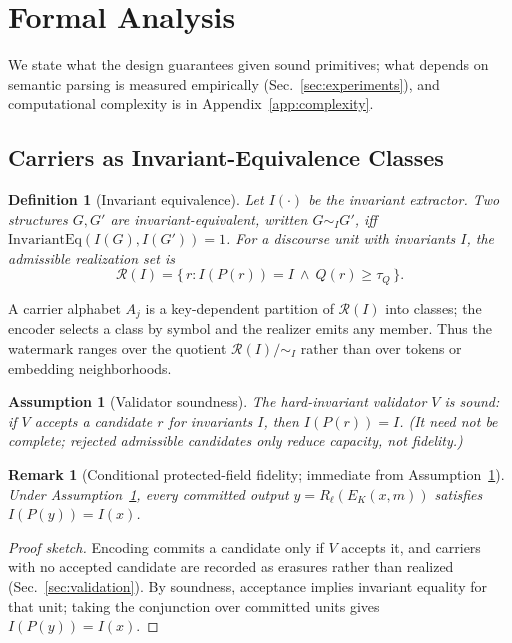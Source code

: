 \documentclass[journal]{IEEEtran}
\newtheorem{definition}{Definition}
\newtheorem{assumption}{Assumption}
\newtheorem{remark}{Remark}
\begin{document}
\section{Formal Analysis}
\label{sec:analysis}
We state what the design guarantees given sound primitives; what depends on semantic parsing is measured empirically (Sec.~\ref{sec:experiments}), and computational complexity is in Appendix~\ref{app:complexity}.

\subsection{Carriers as Invariant-Equivalence Classes}
\begin{definition}[Invariant equivalence]
Let $I(\cdot)$ be the invariant extractor. Two structures $G,G'$ are invariant-equivalent, written $G\sim_I G'$, iff $\mathrm{InvariantEq}(I(G),I(G'))=1$. For a discourse unit with invariants $I$, the admissible realization set is
\begin{equation}
\mathcal{R}(I)=\{\,r : I(P(r))=I \ \land\ Q(r)\ge \tau_Q\,\}.
\end{equation}
\end{definition}
A carrier alphabet $A_j$ is a key-dependent partition of $\mathcal{R}(I)$ into classes; the encoder selects a class by symbol and the realizer emits any member. Thus the watermark ranges over the quotient $\mathcal{R}(I)/{\sim_I}$ rather than over tokens or embedding neighborhoods.

\begin{assumption}[Validator soundness]
\label{as:validator}
The hard-invariant validator $V$ is sound: if $V$ accepts a candidate $r$ for invariants $I$, then $I(P(r))=I$. (It need not be complete; rejected admissible candidates only reduce capacity, not fidelity.)
\end{assumption}

\begin{remark}[Conditional protected-field fidelity; immediate from Assumption~\ref{as:validator}]
\label{prop:fidelity}
Under Assumption~\ref{as:validator}, every committed output $y=R_\ell(E_K(x,m))$ satisfies $I(P(y))=I(x)$.
\end{remark}
\begin{proof}[Proof sketch]
Encoding commits a candidate only if $V$ accepts it, and carriers with no accepted candidate are recorded as erasures rather than realized (Sec.~\ref{sec:validation}). By soundness, acceptance implies invariant equality for that unit; taking the conjunction over committed units gives $I(P(y))=I(x)$.
\end{proof}
\end{document}

